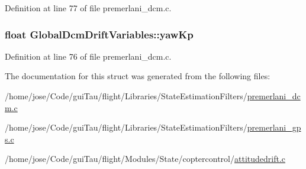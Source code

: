 Definition at line 77 of file premerlani\-\_\-dcm.\-c.

\hypertarget{struct_global_dcm_drift_variables_af0f020f038b168267dd7f4fab0d26178}{
\subsubsection[{yaw\-Kp}]{\setlength{\rightskip}{0pt plus 5cm}float Global\-Dcm\-Drift\-Variables\-::yaw\-Kp}}\label{struct_global_dcm_drift_variables_af0f020f038b168267dd7f4fab0d26178}


Definition at line 76 of file premerlani\-\_\-dcm.\-c.



The documentation for this struct was generated from the following files\-:\begin{DoxyCompactItemize}
\item 
/home/jose/\-Code/gui\-Tau/flight/\-Libraries/\-State\-Estimation\-Filters/\hyperlink{premerlani__dcm_8c}{premerlani\-\_\-dcm.\-c}\item 
/home/jose/\-Code/gui\-Tau/flight/\-Libraries/\-State\-Estimation\-Filters/\hyperlink{premerlani__gps_8c}{premerlani\-\_\-gps.\-c}\item 
/home/jose/\-Code/gui\-Tau/flight/\-Modules/\-State/coptercontrol/\hyperlink{attitudedrift_8c}{attitudedrift.\-c}\end{DoxyCompactItemize}
